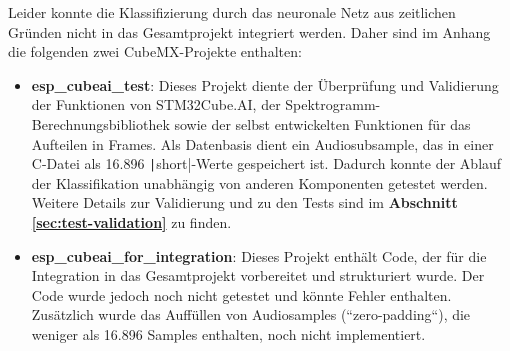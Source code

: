 Leider konnte die Klassifizierung durch das neuronale Netz aus zeitlichen Gründen nicht in das Gesamtprojekt integriert werden. Daher sind im Anhang die folgenden zwei CubeMX-Projekte enthalten:

\begin{itemize}
\item \textbf{esp\_cubeai\_test}: Dieses Projekt diente der Überprüfung und Validierung der Funktionen von STM32Cube.AI, der Spektrogramm-Berechnungsbibliothek sowie der selbst entwickelten Funktionen für das Aufteilen in Frames. Als Datenbasis dient ein Audiosubsample, das in einer C-Datei als 16.896 \texttt|short|-Werte gespeichert ist. Dadurch konnte der Ablauf der Klassifikation unabhängig von anderen Komponenten getestet werden. Weitere Details zur Validierung und zu den Tests sind im \textbf{Abschnitt \ref{sec:test-validation}} zu finden.
\item \textbf{esp\_cubeai\_for\_integration}: Dieses Projekt enthält Code, der für die Integration in das Gesamtprojekt vorbereitet und strukturiert wurde. Der Code wurde jedoch noch nicht getestet und könnte Fehler enthalten. Zusätzlich wurde das Auffüllen von Audiosamples (``zero-padding``), die weniger als 16.896 Samples enthalten, noch nicht implementiert.
\end{itemize}
